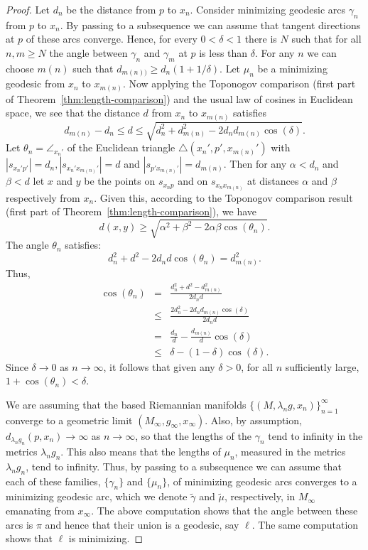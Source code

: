 \begin{proof}
\sketch
{}
Let $d_n$ be the distance from $p$ to $x_n$. Consider minimizing
geodesic arcs $\gamma_n$ from $p$ to $x_n$. By passing to a
subsequence we can assume that tangent directions at $p$ of these
arcs converge. Hence, for every $0<\delta<1$ there is $N$ such that
for all $n,m\ge N$ the angle between $\gamma_n$ and $\gamma_m$ at
$p$ is less than $\delta$. For any $n$ we can choose $m(n)$ such
that $d_{m(n))}\ge d_n(1+1/\delta)$. Let $\mu_n$ be a minimizing
geodesic from $x_n$ to $x_{m(n)}$.
 Now applying the Toponogov comparison
(first part of Theorem~\ref{thm:length-comparison}) and the usual law of
cosines in Euclidean space, we see that the distance $d$ from $x_n$
to $x_{m(n)}$ satisfies
$$d_{m(n)}-d_n\le d\le \sqrt{d_n^2+d_{m(n)}^2-2d_nd_{m(n)}\cos(\delta)}.$$ Let $\theta_n=\angle_{x_n'}$ of the Euclidean triangle
$\triangle(x_n',p',x_{m(n)}')$ with $|s_{x_n'p'}|=d_n,|s_{x_n'x_{m(n)}'}|=d$
and $|s_{p'x_{m(n)}'}|=d_{m(n)}$. Then for any $\alpha<d_n$ and $\beta<d$ let
$x$ and $y$ be the points on $s_{x_np}$ and on $s_{x_nx_{m(n)}}$ at distances
$\alpha$ and $\beta$ respectively from $x_n$. Given this, according to the
Toponogov comparison result (first part of Theorem~\ref{thm:length-comparison}), we have
$$d(x,y)\ge \sqrt{\alpha^2+\beta^2-2\alpha\beta\cos(\theta_n)}.$$
The angle $\theta_n$ satisfies:
$$d_n^2+d^2-2d_nd\cos(\theta_n)=d_{m(n)}^2.$$
Thus, \begin{eqnarray*} \cos(\theta_n) & = &
\frac{d_n^2+d^2-d_{m(n)}^2}{2d_nd} \\
& \le & \frac{2d_n^2-2d_nd_{m(n)}\cos(\delta)} {2d_nd} \\
& = & \frac{d_n}{d}-\frac{d_{m(n)}}{d}\cos(\delta)\\
& \le & \delta-(1-\delta)\cos(\delta).
\end{eqnarray*}
Since $\delta\rightarrow 0$ as $n\rightarrow\infty$, it follows that
given any $\delta>0$, for all  $n$ sufficiently large, $1+\cos(\theta_n)<\delta$.

We are assuming that the based Riemannian manifolds
$\{(M,\lambda_ng,x_n)\}_{n=1}^\infty$ converge to a geometric limit
$(M_\infty,g_\infty,x_\infty)$. Also, by assumption,
$d_{\lambda_ng_n}(p,x_n)\rightarrow \infty$ as $n\rightarrow
\infty$, so that the lengths of the $\gamma_n$ tend to infinity in
the metrics $\lambda_ng_n$. This also means that the lengths of
$\mu_n$, measured in the metrics $\lambda_ng_n$, tend to infinity.
Thus, by passing to a subsequence we can assume that each of these
families, $\{\gamma_n\}$ and $\{\mu_n\}$, of minimizing geodesic
arcs converges to a minimizing geodesic arc, which we denote $\tilde
\gamma$ and $\tilde \mu$, respectively, in $M_\infty$ emanating from
$x_\infty$. The above computation shows that the angle between these
arcs is $\pi$ and hence that their union is a geodesic, say $\ell$.
The same computation shows that  $\ell $ is minimizing.


\end{proof}
